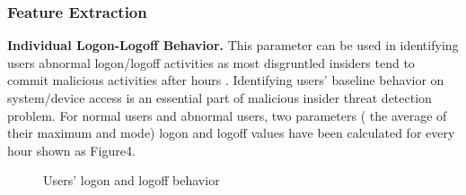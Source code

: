 \documentclass[conference]{IEEEtran}
\begin{document}
\subsubsection{Feature Extraction}


\textbf{Individual Logon-Logoff Behavior.} This parameter can be used in identifying users abnormal logon/logoff activities as most disgruntled insiders tend to commit malicious activities after hours \cite{b40}. Identifying users’ baseline behavior on system/device access is an essential part of malicious insider threat detection problem. For normal users and abnormal users, two parameters ( the average of their maximum and mode) logon and logoff values have been calculated for every hour shown as Figure4. 

\begin{figure}[!t]
\centering
{} 
\caption{ Users’ logon and logoff behavior }
\label{fig5}
\end{figure}
\end{document}
